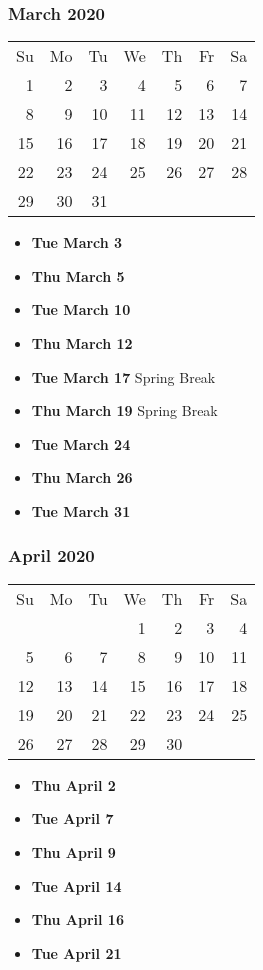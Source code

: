 \documentclass[11pt]{article}
\begin{document}
\subsubsection*{March 2020}
\begin{tabular}{rrrrrrr}
Su & Mo & Tu & We & Th & Fr & Sa\\
 1 &  2 &  3 &  4 &  5 &  6 &  7\\ 
 8 &  9 & 10 & 11 & 12 & 13 & 14\\ 
15 & 16 & 17 & 18 & 19 & 20 & 21\\ 
22 & 23 & 24 & 25 & 26 & 27 & 28\\
29 & 30 & 31 &    &    &    & \\
\end{tabular}
\begin{itemize}
\item\textbf{Tue March  3}
\item\textbf{Thu March  5}
\item\textbf{Tue March 10}
\item\textbf{Thu March 12}
\item\textbf{Tue March 17} Spring Break
\item\textbf{Thu March 19} Spring Break
\item\textbf{Tue March 24}
\item\textbf{Thu March 26}
\item\textbf{Tue March 31}
\end{itemize}
\hrulefill

\subsubsection*{April 2020}
\begin{tabular}{rrrrrrr}
Su & Mo & Tu & We & Th & Fr & Sa\\
   &    &    &  1 &  2 &  3 &  4\\
 5 &  6 &  7 &  8 &  9 & 10 & 11\\
12 & 13 & 14 & 15 & 16 & 17 & 18\\
19 & 20 & 21 & 22 & 23 & 24 & 25\\ 
26 & 27 & 28 & 29 & 30 &    &\\ 
\end{tabular}
\begin{itemize}
\item\textbf{Thu April  2}
\item\textbf{Tue April  7}
\item\textbf{Thu April  9}
\item\textbf{Tue April 14}
\item\textbf{Thu April 16}
\item\textbf{Tue April 21}
\end{itemize}
\hrulefill
\end{document}
